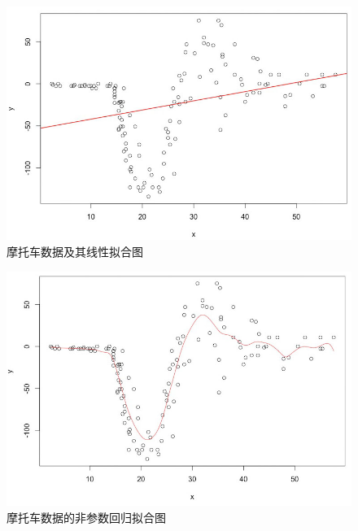 \documentclass[12pt,a4paper,openany,twoside]{book}
\numberwithin{figure}{chapter}
\numberwithin{table}{chapter}
\numberwithin{equation}{chapter}
\begin{document}
\begin{figure}[H]
\begin{centering}
\includegraphics[width=14cm]{figure/mcyclelm}
\par\end{centering}

\caption{摩托车数据及其线性拟合图\label{fig:=006469=006258=008F66=006570=00636E=0053CA=005176=007EBF=006027=0062DF=005408=0056FE}}
\end{figure}


\begin{figure}[H]
\begin{centering}
\includegraphics[width=14cm]{figure/mcycleloc}
\par\end{centering}

\caption{摩托车数据的非参数回归拟合图\label{fig:=006469=006258=008F66=006570=00636E=007684=00975E=0053C2=006570=0056DE=005F52=0062DF=005408=0056FE}}
\end{figure}
\end{document}
